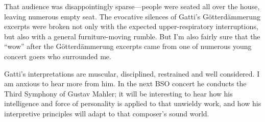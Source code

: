 That audience was disappointingly sparse—people were seated all over the house, leaving numerous empty seat. The evocative silences of Gatti’s Götterdämmerung excerpts were broken not only with the expected upper-respiratory interruptions, but also with a general furniture-moving rumble. But I’m also fairly sure that the “wow” after the Götterdämmerung excerpts came from one of numerous young concert goers who surrounded me.

Gatti’s interpretations are muscular, disciplined, restrained and well considered. I am anxious to hear more from him. In the next BSO concert he conducts the Third Symphony of Gustav Mahler; it will be interesting to hear how his intelligence and force of personality is applied to that unwieldy work, and how his interpretive principles will adapt to that composer’s sound world.
